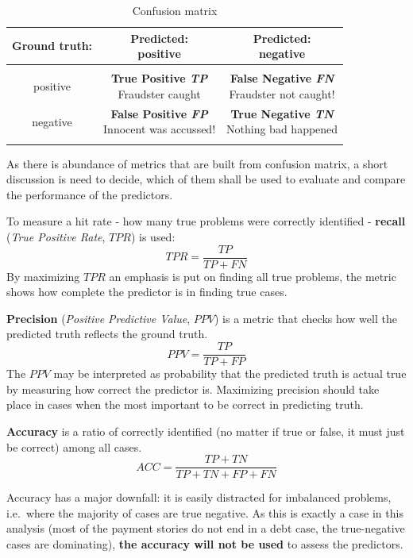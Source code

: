 \documentclass{article}
\begin{document}
\begin{table}[!htbp]
    \centering
    \caption{Confusion matrix}
    \label{tab:305_confusion_matrix}
    \begin{tabular}{c c c}
    \\ \hline\hline
    Ground truth: & \makecell{Predicted:\\positive} & \makecell{Predicted:\\negative} \\
    \hline \\
    positive & \makecell{\textbf{True Positive \textit{TP}} \\ Fraudster caught} & \makecell{\textbf{False Negative \textit{FN}} \\ Fraudster not caught!}\\
    negative & \makecell{\textbf{False Positive \textit{FP}} \\ Innocent was accussed!} & \makecell{\textbf{True Negative \textit{TN}} \\ Nothing bad happened}\\
    \hline\hline \\
    \end{tabular}
\end{table}

As there is abundance of metrics that are built from confusion matrix, a short discussion is need to decide,
which of them shall be used to evaluate and compare the performance of the predictors.
\vspace{0.5cm}
\par To measure a hit rate - how many true problems were correctly identified - \textbf{recall} (\textit{True Positive Rate}, $TPR$) is used:
\[TPR=\frac{TP}{TP+FN}\]
By maximizing $TPR$ an emphasis is put on finding all true problems, the metric shows how complete the predictor is in finding true cases.
\vspace{0.5cm}
\par \textbf{Precision} (\textit{Positive Predictive Value}, $PPV$) is a metric that checks how well the predicted truth reflects the ground truth.
\[PPV=\frac{TP}{TP+FP}\]
The $PPV$ may be interpreted as probability that the predicted truth is actual true by measuring how correct the predictor is.
Maximizing precision should take place in cases when the most important to be correct in predicting truth.
\vspace{0.5cm}
\par \textbf{Accuracy} is a ratio of correctly identified (no matter if true or false, it must just be correct) among all cases.
\[ACC=\frac{TP+TN}{TP+TN+FP+FN}\]
\par Accuracy has a major downfall: it is easily distracted for imbalanced problems, i.e.\ where the majority of cases are true negative.
As this is exactly a case in this analysis (most of the payment stories do not end in a debt case, the true-negative cases are dominating),
\textbf{the accuracy will not be used} to assess the predictors.
\vspace{0.5cm}
\end{document}

